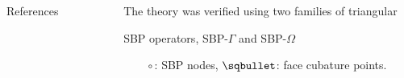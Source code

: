 \documentclass[final]{beamer}
\newlength{\sepwid}
\newlength{\secondcolwid}
\newlength{\thirdcolwid}
\begin{document}
\begin{frame}[t]
\begin{columns}[t]
\begin{column}{\secondcolwid}
\begin{block}{References}
    \nocite{*} %
    \footnotesize{
    \vspace{0.15in}}
    
\end{block}
\end{column} %


\begin{column}{\sepwid}\end{column} %







\begin{column}{\thirdcolwid}
     \setlength{\parindent}{1em}
\vskip-1.0cm
\begin{alertblock}{The theory was verified using two families of triangular
        
         SBP operators, SBP-$\Gamma$ and SBP-$\Omega$~\cite{multiSBP}}
$\quad\quad\circ$: SBP nodes, $\sqbullet$: face cubature points.


\end{alertblock}
\end{column}
\end{columns}
\end{frame}
\end{document}
